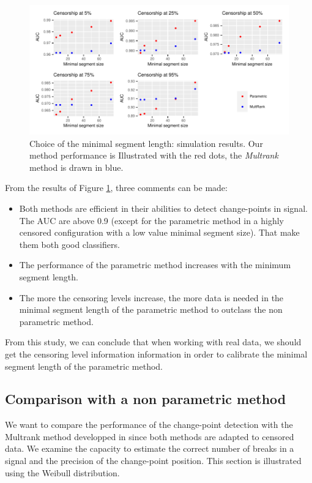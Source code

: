 \begin{figure}[ht]
\centering
\includegraphics{figs/Chap4/sim_minseg.pdf}
\caption{Choice of the minimal segment length: simulation results. Our method performance is Illustrated with the red dots, the \textit{Multrank} method is drawn in blue.}
\label{fig:sim_minseg}
\end{figure}

From the results of Figure \ref{fig:sim_minseg}, three comments can be made:  
\begin{itemize}
\item Both methods are efficient in their abilities to detect change-points in signal. The AUC are above 0.9 (except for the parametric method in a highly censored configuration with a low value minimal segment size). That make them both good classifiers. 
\item The performance of the parametric method increases with the minimum segment length. 
\item The more the censoring levels increase, the more data is needed in the minimal segment length of the parametric method to outclass the non parametric method. 
\end{itemize}
From this study, we can conclude that when working with real data, we should get the censoring level information information in order to calibrate the minimal segment length of the parametric method.  

\subsection{Comparison with a non parametric method}

We want to compare the performance of the change-point detection with the Multrank method developped in \cite{lung2015} since both methods are adapted to censored data. We examine the capacity to estimate the correct number of breaks in a signal and the precision of the change-point position. This section is illustrated using the Weibull distribution.   

